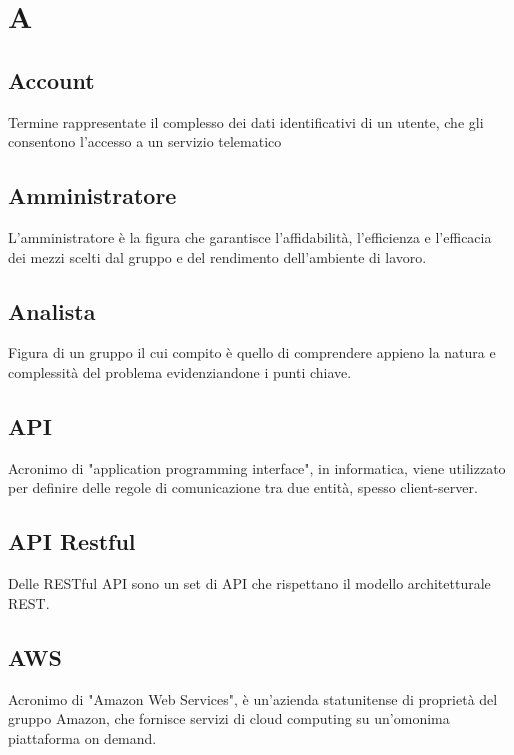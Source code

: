 \section{A}
	\subsection{Account}
		Termine rappresentate il complesso dei dati identificativi di un utente, che gli consentono l'accesso a un servizio telematico
	\subsection{Amministratore}  
		L'amministratore è la figura che garantisce l’affidabilità, l’efficienza e l’efficacia dei mezzi scelti dal gruppo e del rendimento dell’ambiente di lavoro.
	\subsection{Analista}  
		Figura di un gruppo il cui compito è quello di comprendere appieno la natura e complessità del problema evidenziandone i punti chiave.
	\subsection{API}  
		Acronimo di "application programming interface", in informatica, viene utilizzato per definire delle regole di comunicazione tra due entità, spesso client-server.
	\subsection{API Restful}  
		Delle RESTful API sono un set di API che rispettano il modello architetturale REST.
	\subsection{AWS}
		Acronimo di "Amazon Web Services", è un'azienda statunitense di proprietà del gruppo Amazon, che fornisce servizi di cloud computing su un'omonima piattaforma on demand.
		
\newpage